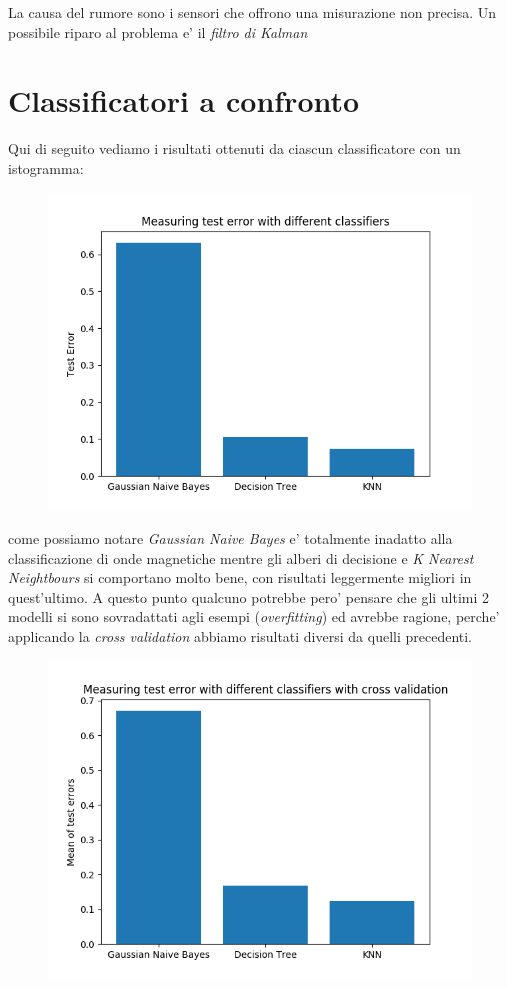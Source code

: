La causa del rumore sono i sensori che offrono una misurazione non precisa. Un possibile riparo al problema e' il \textit{filtro di Kalman}

\section*{Classificatori a confronto}
Qui di seguito vediamo i risultati ottenuti da ciascun classificatore con un istogramma:

\begin{figure}[H]
	\centering
	\includegraphics[width=0.7\linewidth]{img/test_errors}
	\caption{}
	\label{fig:testerrors}
\end{figure}

come possiamo notare \textit{Gaussian Naive Bayes} e' totalmente inadatto alla classificazione di onde magnetiche mentre gli alberi di decisione e \textit{K Nearest Neightbours} si comportano molto bene, con risultati leggermente migliori in quest'ultimo.
A questo punto qualcuno potrebbe pero' pensare che gli ultimi 2 modelli si sono sovradattati agli esempi (\textit{overfitting}) ed avrebbe ragione, perche' applicando la \textit{cross validation} abbiamo risultati diversi da quelli precedenti.

\begin{figure}[H]
	\centering
	\includegraphics[width=0.7\linewidth]{img/test_errors_cross_validation}
	\caption{}
	\label{fig:testerrorscrossvalidation}
\end{figure}


